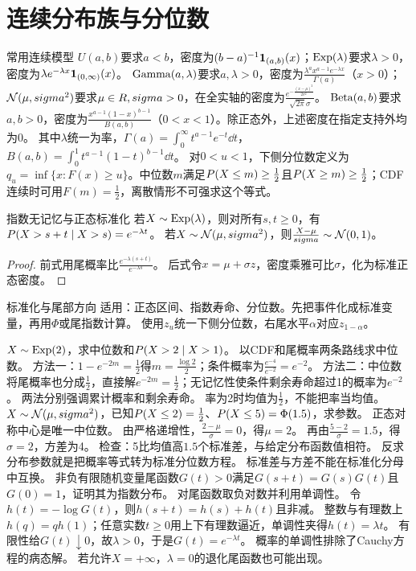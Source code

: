 \section{连续分布族与分位数}\label{sec:23}
\begin{definition}{常用连续模型}
$U(a,b)$要求$a<b$，密度为$(b-a)^{-1}\mathbf1_{(a,b)}(x)$；$\operatorname{Exp}(\lambda)$要求$\lambda>0$，密度为$\lambda e^{-\lambda x}\mathbf1_{(0,\infty)}(x)$。
$\operatorname{Gamma}(a,\lambda)$要求$a,\lambda>0$，密度为$\frac{\lambda^ax^{a-1}e^{-\lambda x}}{\Gamma(a)}$（$x>0$）；$\mathcal N(\mu,sigma^2)$要求$\mu\in R,sigma>0$，在全实轴的密度为$\frac{e^{-\frac{(x-\mu)^2}{2\sigma^2}}}{\sqrt{2\pi}\sigma}$。
$\operatorname{Beta}(a,b)$要求$a,b>0$，密度为$\frac{x^{a-1}(1-x)^{b-1}}{B(a,b)}$（$0<x<1$）。除正态外，上述密度在指定支持外均为0。
其中$\lambda$统一为率，$\Gamma(a)=\int_0^\infty t^{a-1}e^{-t}\dd t$，$B(a,b)=\int_0^1t^{a-1}(1-t)^{b-1}\dd t$。
对$0<u<1$，下侧分位数定义为$q_u=\inf\{x:F(x)\ge u\}$。中位数$m$满足$P(X\le m)\ge\frac{1}{2}$且$P(X\ge m)\ge\frac{1}{2}$；CDF连续时可用$F(m)=\frac{1}{2}$，离散情形不可强求这个等式。
\end{definition}
\begin{theorem}{指数无记忆与正态标准化}
若$X\sim\operatorname{Exp}(\lambda)$，则对所有$s,t\ge0$，有$P(X>s+t\mid X>s)=e^{-\lambda t}$。
若$X\sim\mathcal N(\mu,sigma^2)$，则$\frac{X-\mu}{sigma}\sim\mathcal N(0,1)$。
\end{theorem}
\begin{proof}
前式用尾概率比$\frac{e^{-\lambda(s+t)}}{e^{-\lambda s}}$。
后式令$x=\mu+\sigma z$，密度乘雅可比$\sigma$，化为标准正态密度。
\end{proof}
\begin{method}{标准化与尾部方向}
适用：正态区间、指数寿命、分位数。先把事件化成标准变量，再用$\Phi$或尾指数计算。
使用$z_u$统一下侧分位数，右尾水平$\alpha$对应$z_{1-\alpha}$。
\end{method}
{$X\sim\operatorname{Exp}(2)$，求中位数和$P(X>2\mid X>1)$。}
{以CDF和尾概率两条路线求中位数。}
{方法一：$1-e^{-2m}=\frac{1}{2}$得$m=\frac{\log2}{2}$；条件概率为$\frac{e^{-4}}{e^{-2}}=e^{-2}$。
方法二：中位数将尾概率也分成$\frac{1}{2}$，直接解$e^{-2m}=\frac{1}{2}$；无记忆性使条件剩余寿命超过1的概率为$e^{-2}$。}
{两法分别强调累计概率和剩余寿命。}
{率为2时均值为$\frac{1}{2}$，不能把率当均值。}
{$X\sim\mathcal N(\mu,sigma^2)$，已知$P(X\le2)=\frac{1}{2}$、$P(X\le5)=\Phi(1.5)$，求参数。}
{正态对称中心是唯一中位数。}
{由严格递增性，$\frac{2-\mu}{\sigma}=0$，得$\mu=2$。
再由$\frac{5-2}{\sigma}=1.5$，得$\sigma=2$，方差为4。
检查：5比均值高$1.5$个标准差，与给定分布函数值相符。}
{反求分布参数就是把概率等式转为标准分位数方程。}
{标准差与方差不能在标准化分母中互换。}
{非负有限随机变量尾函数$G(t)>0$满足$G(s+t)=G(s)G(t)$且$G(0)=1$，证明其为指数分布。}
{对尾函数取负对数并利用单调性。}
{令$h(t)=-\log G(t)$，则$h(s+t)=h(s)+h(t)$且非减。
整数与有理数上$h(q)=qh(1)$；任意实数$t\ge0$用上下有理数逼近，单调性夹得$h(t)=\lambda t$。
有限性给$G(t)\downarrow0$，故$\lambda>0$，于是$G(t)=e^{-\lambda t}$。}
{概率的单调性排除了Cauchy方程的病态解。}
{若允许$X=+\infty$，$\lambda=0$的退化尾函数也可能出现。}

